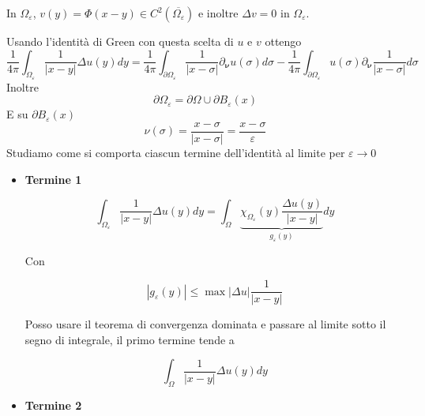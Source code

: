 \documentclass[10pt,a4paper,twoside,openright]{book}
\begin{document}
\begin{dimostrazione}
	In $\displaystyle \Omega _{\varepsilon }$, $\displaystyle v(y) =\Phi (x-y) \in C^{2}\left(\overline{\Omega _{\varepsilon }}\right)$ e inoltre $\displaystyle \Delta v=0$ in $\displaystyle \Omega _{\varepsilon }$.
	
	Usando l'identità di Green con questa scelta di $\displaystyle u$ e $\displaystyle v$ ottengo
	\begin{equation*}
		\frac{1}{4\pi }\int _{\Omega _{\varepsilon }}\frac{1}{| x-y| } \Delta u(y) dy=\frac{1}{4\pi }\int _{\partial \Omega _{\varepsilon }}\frac{1}{| x-\sigma | } \partial _{\bm{\nu}} u(\sigma) d\sigma -\frac{1}{4\pi }\int _{\partial \Omega _{\varepsilon }} u(\sigma) \partial _{\bm{\nu}}\frac{1}{| x-\sigma | } d\sigma 
	\end{equation*}
	Inoltre
	\begin{equation*}
		\partial \Omega _{\varepsilon } =\partial \Omega \cup \partial B_{\varepsilon }(x)
	\end{equation*}
	E su $\displaystyle \partial B_{\varepsilon }(x)$
	\begin{equation*}
		\nu (\sigma) =\frac{x-\sigma }{| x-\sigma | } =\frac{x-\sigma }{\varepsilon }
	\end{equation*}
	Studiamo come si comporta ciascun termine dell'identità al limite per $\displaystyle \varepsilon \rightarrow 0$
	\begin{itemize}
		\item \textbf{Termine 1}
		      
		      \begin{equation*}
		      	\int _{\Omega _{\varepsilon }}\frac{1}{| x-y| } \Delta u(y) dy=\int _{\Omega }\underbrace{\chi _{\Omega _{\varepsilon }}(y)\frac{\Delta u(y)}{| x-y| }}_{g_{\varepsilon }(y)} dy
		      \end{equation*}
		      
		      Con 
		      
		      \begin{equation*}
		      	| g_{\varepsilon }(y)| \leqslant \max| \Delta u| \frac{1}{| x-y| }
		      \end{equation*}
		      
		      Posso usare il teorema di convergenza dominata e passare al limite sotto il segno di integrale, il primo termine tende a
		      
		      \begin{equation*}
		      	\int _{\Omega }\frac{1}{| x-y| } \Delta u(y) dy
		      \end{equation*}
		\item \textbf{Termine 2}
		      

\end{itemize}
\end{dimostrazione}
\end{document}

